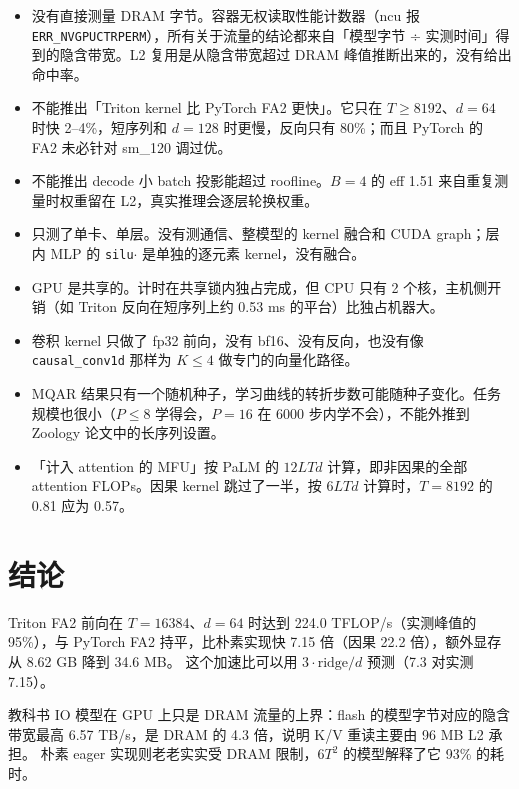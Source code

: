 \documentclass[11pt,a4paper]{ctexart}
\begin{document}
\begin{caveatbox}
\begin{itemize}
\item 没有直接测量 DRAM 字节。容器无权读取性能计数器（ncu 报 \texttt{ERR\_NVGPUCTRPERM}），所有关于流量的结论都来自「模型字节 ÷ 实测时间」得到的隐含带宽。L2 复用是从隐含带宽超过 DRAM 峰值推断出来的，没有给出命中率。
\item 不能推出「Triton kernel 比 PyTorch FA2 更快」。它只在 $T\ge8192$、$d=64$ 时快 2–4\%，短序列和 $d=128$ 时更慢，反向只有 80\%；而且 PyTorch 的 FA2 未必针对 sm\_120 调过优。
\item 不能推出 decode 小 batch 投影能超过 roofline。$B=4$ 的 eff 1.51 来自重复测量时权重留在 L2，真实推理会逐层轮换权重。
\item 只测了单卡、单层。没有测通信、整模型的 kernel 融合和 CUDA graph；层内 MLP 的 \texttt{silu}$\cdot$ 是单独的逐元素 kernel，没有融合。
\item GPU 是共享的。计时在共享锁内独占完成，但 CPU 只有 2 个核，主机侧开销（如 Triton 反向在短序列上约 0.53 ms 的平台）比独占机器大。
\item 卷积 kernel 只做了 fp32 前向，没有 bf16、没有反向，也没有像 \texttt{causal\_conv1d} 那样为 $K\le4$ 做专门的向量化路径。
\item MQAR 结果只有一个随机种子，学习曲线的转折步数可能随种子变化。任务规模也很小（$P\le8$ 学得会，$P=16$ 在 6000 步内学不会），不能外推到 Zoology 论文中的长序列设置。
\item 「计入 attention 的 MFU」按 PaLM 的 $12LTd$ 计算，即非因果的全部 attention FLOPs。因果 kernel 跳过了一半，按 $6LTd$ 计算时，$T=8192$ 的 0.81 应为 0.57。
\end{itemize}
\end{caveatbox}

\section{结论}

\begin{findingbox}[：FlashAttention]
Triton FA2 前向在 $T=16384$、$d=64$ 时达到 224.0 TFLOP/s（实测峰值的 95\%），与 PyTorch FA2 持平，比朴素实现快 7.15 倍（因果 22.2 倍），额外显存从 8.62 GB 降到 34.6 MB。
这个加速比可以用 $3\cdot\text{ridge}/d$ 预测（7.3 对实测 7.15）。
\end{findingbox}

\begin{findingbox}[：IO 模型]
教科书 IO 模型在 GPU 上只是 DRAM 流量的上界：flash 的模型字节对应的隐含带宽最高 6.57 TB/s，是 DRAM 的 4.3 倍，说明 K/V 重读主要由 96 MB L2 承担。
朴素 eager 实现则老老实实受 DRAM 限制，$6T^2$ 的模型解释了它 93\% 的耗时。
\end{findingbox}
\end{document}
